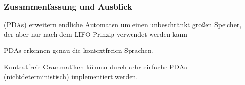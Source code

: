 \documentclass[aspectratio=1610,onlymath]{beamer}
\begin{document}
\begin{frame}\frametitle{Zusammenfassung und Ausblick}

 (PDAs) erweitern endliche Automaten um einen unbeschränkt großen Speicher,
der aber nur nach dem LIFO-Prinzip verwendet werden kann.
\bigskip

PDAs erkennen genau die kontextfreien Sprachen.
\bigskip

Kontextfreie Grammatiken können durch sehr einfache PDAs (nichtdeterministisch) implementiert werden.\bigskip


\end{frame}
\end{document}
